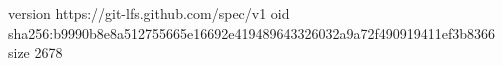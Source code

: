 version https://git-lfs.github.com/spec/v1
oid sha256:b9990b8e8a512755665e16692e419489643326032a9a72f490919411ef3b8366
size 2678

